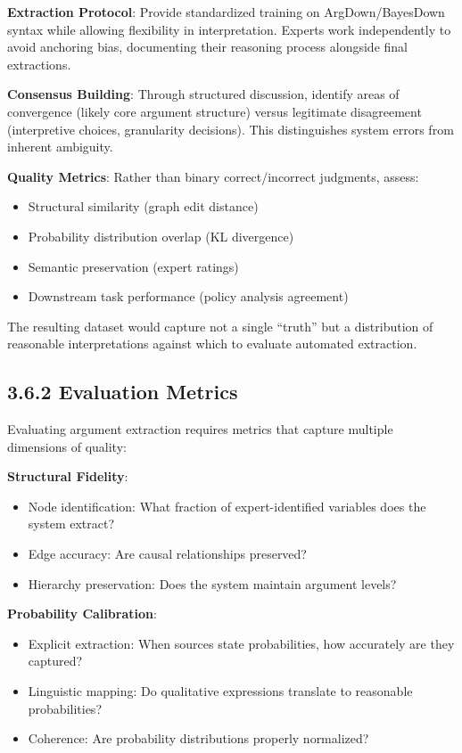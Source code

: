 \documentclass[
  11pt,
  letterpaper,
]{book}
\providecommand{\tightlist}{%
  \setlength{\itemsep}{0pt}\setlength{\parskip}{0pt}}
\begin{document}
\textbf{Extraction Protocol}: Provide standardized training on
ArgDown/BayesDown syntax while allowing flexibility in interpretation.
Experts work independently to avoid anchoring bias, documenting their
reasoning process alongside final extractions.

\textbf{Consensus Building}: Through structured discussion, identify
areas of convergence (likely core argument structure) versus legitimate
disagreement (interpretive choices, granularity decisions). This
distinguishes system errors from inherent ambiguity.

\textbf{Quality Metrics}: Rather than binary correct/incorrect
judgments, assess:

\begin{itemize}
\tightlist
\item
  Structural similarity (graph edit distance)
\item
  Probability distribution overlap (KL divergence)
\item
  Semantic preservation (expert ratings)
\item
  Downstream task performance (policy analysis agreement)
\end{itemize}

The resulting dataset would capture not a single ``truth'' but a
distribution of reasonable interpretations against which to evaluate
automated extraction.

\subsection{3.6.2 Evaluation Metrics}\label{sec-evaluation-metrics}

Evaluating argument extraction requires metrics that capture multiple
dimensions of quality:

\textbf{Structural Fidelity}:

\begin{itemize}
\tightlist
\item
  Node identification: What fraction of expert-identified variables does
  the system extract?
\item
  Edge accuracy: Are causal relationships preserved?
\item
  Hierarchy preservation: Does the system maintain argument levels?
\end{itemize}

\textbf{Probability Calibration}:

\begin{itemize}
\tightlist
\item
  Explicit extraction: When sources state probabilities, how accurately
  are they captured?
\item
  Linguistic mapping: Do qualitative expressions translate to reasonable
  probabilities?
\item
  Coherence: Are probability distributions properly normalized?
\end{itemize}
\end{document}
